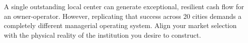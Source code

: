 A single outstanding local center can generate exceptional, resilient cash flow for an owner-operator. However, replicating that success across 20 cities demands a completely different managerial operating system. Align your market selection with the physical reality of the institution you desire to construct.
